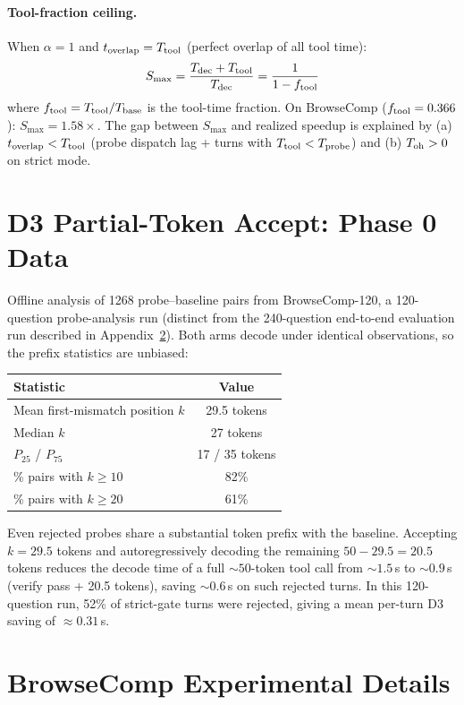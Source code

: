 \paragraph{Tool-fraction ceiling.}
When $\alpha = 1$ and $t_{\mathrm{overlap}} = T_{\mathrm{tool}}$ (perfect overlap of all tool time):
\[
  S_{\max} = \frac{T_{\mathrm{dec}} + T_{\mathrm{tool}}}{T_{\mathrm{dec}}} = \frac{1}{1 - f_{\mathrm{tool}}}
\]
where $f_{\mathrm{tool}} = T_{\mathrm{tool}} / T_{\mathrm{base}}$ is the tool-time fraction.
On BrowseComp ($f_{\mathrm{tool}} = 0.366$): $S_{\max} = 1.58\times$.
The gap between $S_{\max}$ and realized speedup is explained by (a) $t_{\mathrm{overlap}} < T_{\mathrm{tool}}$ (probe dispatch lag + turns with $T_{\mathrm{tool}} < T_{\mathrm{probe}}$) and (b) $T_{\mathrm{oh}} > 0$ on strict mode.

\section{D3 Partial-Token Accept: Phase 0 Data}
\label{app:d3}

Offline analysis of 1268 probe--baseline pairs from BrowseComp-120, a 120-question
probe-analysis run (distinct from the 240-question end-to-end evaluation run
described in Appendix~\ref{app:browsecomp}).
Both arms decode under identical observations, so the prefix statistics are
unbiased:

\begin{center}
\small
\begin{tabular}{lc}
\toprule
Statistic & Value \\
\midrule
Mean first-mismatch position $k$ & 29.5 tokens \\
Median $k$ & 27 tokens \\
$P_{25}$ / $P_{75}$ & 17 / 35 tokens \\
\% pairs with $k \geq 10$ & 82\% \\
\% pairs with $k \geq 20$ & 61\% \\
\bottomrule
\end{tabular}
\end{center}

Even rejected probes share a substantial token prefix with the baseline.
Accepting $k = 29.5$ tokens and autoregressively decoding the remaining $50 - 29.5 = 20.5$ tokens reduces the decode time of a full ${\sim}50$-token tool call from $\sim 1.5$\,s to $\sim 0.9$\,s (verify pass + 20.5 tokens), saving $\sim 0.6$\,s on such rejected turns.
In this 120-question run, 52\% of strict-gate turns were rejected, giving a mean per-turn D3 saving of $\approx 0.31$\,s.

\section{BrowseComp Experimental Details}
\label{app:browsecomp}

